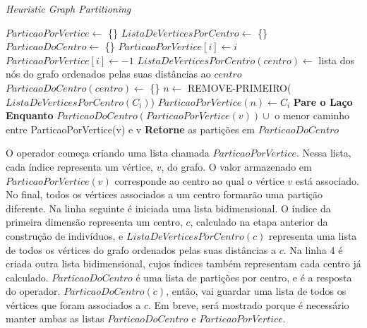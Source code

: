 \begin{algorithm}                  %
	\caption{\textit{Heuristic Graph Partitioning}}          %
	\label{partitioning_fungal}                           %
	\begin{algorithmic}[1]                    %
		\newline
		\State $ParticaoPorVertice \gets $ \{\}
		\State $ListaDeVerticesPorCentro \gets $ \{\}
		\State $ParticaoDoCentro \gets $ \{\}
				\State $ParticaoPorVertice[i] \gets i$
			\Else
				\State $ParticaoPorVertice[i] \gets -1$
			\EndIf
		\EndFor
			\State $ListaDeVerticesPorCentro(centro) \gets $ lista dos nós do grafo ordenados pelas suas distâncias ao $centro$
			\State $ParticaoDoCentro(centro) \gets $ \{\}
		\EndFor
		\Repeat
					\State $n \gets $ REMOVE-PRIMEIRO($ListaDeVerticesPorCentro(C_{i})$)
						\State $ParticaoPorVertice(n) \gets C_{i}$
						\State \textbf{Pare o Laço Enquanto}
					\EndIf
				\EndWhile
			\EndFor
		 
			\State $ParticaoDoCentro(ParticaoPorVertice(v)) \cup $ {o menor caminho entre ParticaoPorVertice(v) e v}
		\EndFor
		\State \textbf{Retorne} as partições em $ParticaoDoCentro$
		\EndProcedure
	\end{algorithmic}
\end{algorithm}

O operador começa criando uma lista chamada $ParticaoPorVertice$. Nessa lista, 
cada índice representa um vértice, $v$, do grafo. O valor armazenado em 
$ParticaoPorVertice(v)$ corresponde ao centro ao qual o vértice $v$ está 
associado. No final, todos os vértices associados a um centro formarão uma 
partição diferente. Na linha seguinte é iniciada uma lista bidimensional. O 
índice da primeira dimensão representa um centro, $c$, calculado na etapa 
anterior da construção de indivíduos, e $ListaDeVerticesPorCentro(c)$ representa 
uma lista de todos os vértices do grafo ordenados pelas suas distâncias a $c$. 
Na linha 4 é criada outra lista bidimensional, cujos índices também representam 
cada centro já calculado. $ParticaoDoCentro$ é uma lista de partições por centro, 
e é a resposta do operador. $ParticaoDoCentro(c)$, então, vai guardar uma lista 
de todos os vértices que foram associados a $c$. Em breve, será mostrado porque 
é necessário manter ambas as listas $ParticaoDoCentro$ e $ParticaoPorVertice$.

